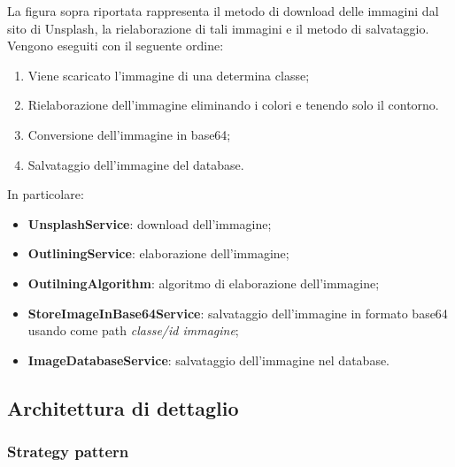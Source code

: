 La figura sopra riportata rappresenta il metodo di download delle immagini dal sito di Unsplash, la rielaborazione di tali immagini e il metodo di salvataggio. Vengono eseguiti con il seguente ordine:
\begin{enumerate}
    \item Viene scaricato l'immagine di una determina classe;
    \item Rielaborazione dell'immagine eliminando i colori e tenendo solo il contorno.
    \item Conversione dell'immagine in base64;
    \item Salvataggio dell'immagine del database.
\end{enumerate}

In particolare:
\begin{itemize}
    \item \textbf{UnsplashService}: download dell'immagine;
    \item \textbf{OutliningService}: elaborazione dell'immagine;
    \item \textbf{OutilningAlgorithm}: algoritmo di elaborazione dell'immagine;
    \item \textbf{StoreImageInBase64Service}: salvataggio dell'immagine in formato base64 usando come path \textit{classe/id immagine};
    \item \textbf{ImageDatabaseService}: salvataggio dell'immagine nel database.
\end{itemize}

\subsection{Architettura di dettaglio}

\subsubsection{Strategy pattern}

